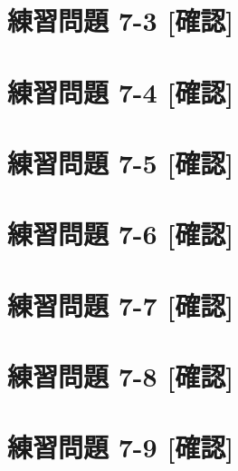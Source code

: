 \documentclass[
]{book}
\begin{document}
\hypertarget{ux7df4ux7fd2ux554fux984c-7-3-ux78baux8a8d}{%
\section*{練習問題 7-3 {[}確認{]}}\label{ux7df4ux7fd2ux554fux984c-7-3-ux78baux8a8d}}

\hypertarget{ux7df4ux7fd2ux554fux984c-7-4-ux78baux8a8d}{%
\section*{練習問題 7-4 {[}確認{]}}\label{ux7df4ux7fd2ux554fux984c-7-4-ux78baux8a8d}}

\hypertarget{ux7df4ux7fd2ux554fux984c-7-5-ux78baux8a8d}{%
\section*{練習問題 7-5 {[}確認{]}}\label{ux7df4ux7fd2ux554fux984c-7-5-ux78baux8a8d}}

\hypertarget{ux7df4ux7fd2ux554fux984c-7-6-ux78baux8a8d}{%
\section*{練習問題 7-6 {[}確認{]}}\label{ux7df4ux7fd2ux554fux984c-7-6-ux78baux8a8d}}

\hypertarget{ux7df4ux7fd2ux554fux984c-7-7-ux78baux8a8d}{%
\section*{練習問題 7-7 {[}確認{]}}\label{ux7df4ux7fd2ux554fux984c-7-7-ux78baux8a8d}}

\hypertarget{ux7df4ux7fd2ux554fux984c-7-8-ux78baux8a8d}{%
\section*{練習問題 7-8 {[}確認{]}}\label{ux7df4ux7fd2ux554fux984c-7-8-ux78baux8a8d}}

\hypertarget{ux7df4ux7fd2ux554fux984c-7-9-ux78baux8a8d}{%
\section*{練習問題 7-9 {[}確認{]}}\label{ux7df4ux7fd2ux554fux984c-7-9-ux78baux8a8d}}
\end{document}
